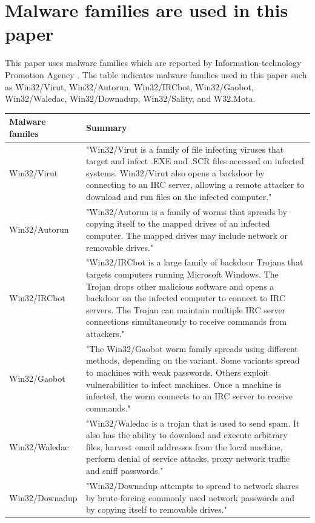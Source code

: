 \section{Malware families are used in this paper} 
This paper uses malware families which are reported by Information-technology Promotion Agency \cite{ipa}. The table indicates malware families used in this paper such as Win32/Virut, Win32/Autorun, Win32/IRCbot, Win32/Gaobot, Win32/Waledac, Win32/Downadup, Win32/Sality, and W32.Mota.

\begin{center}
\begin{table}
\begin{tabular}{ l | p{13cm} }
Malware familes & Summary\\ \hline
Win32/Virut & "Win32/Virut is a family of file infecting viruses that target and infect .EXE and .SCR files accessed on infected systems.
 Win32/Virut also opens a backdoor by connecting to an IRC server, allowing a remote attacker to download and run files on the infected computer." \cite{virut}\\ \hline
Win32/Autorun & "Win32/Autorun is a family of worms that spreads by copying itself to the mapped drives of an infected computer. The mapped drives may include network or removable drives." \cite{autorun}\\\hline
Win32/IRCbot & "Win32/IRCbot is a large family of backdoor Trojans that targets computers running Microsoft Windows. The Trojan drops other malicious software and opens a backdoor on the infected computer to connect to IRC servers. The Trojan can maintain multiple IRC server connections simultaneously to receive commands from attackers." \cite{ircbot}\\ \hline
Win32/Gaobot & "The Win32/Gaobot worm family spreads using different methods, depending on the variant. Some variants spread to machines with weak passwords. Others exploit vulnerabilities to infect machines. Once a machine is infected, the worm connects to an IRC server to receive commands." \cite{gaobot}\\ \hline
Win32/Waledac & "Win32/Waledac is a trojan that is used to send spam. It also has the ability to download and execute arbitrary files, harvest email addresses from the local machine, perform denial of service attacks, proxy network traffic and sniff passwords." \cite{walemac}\\ \hline
Win32/Downadup & "Win32/Downadup attempts to spread to network shares by brute-forcing commonly used network passwords and by copying itself to removable drives." \cite{downadup}\\ \hline 

\end{tabular}
\end{table}
\end{center}
